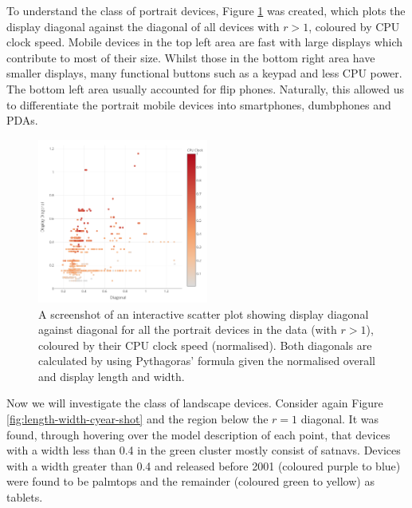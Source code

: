 \documentclass[conference]{IEEEtran}
\begin{document}
To understand the class of portrait devices, Figure \ref{fig:ddiag-diag-ccpu-shot}
was created, which plots the display diagonal against the diagonal of all
devices with $r>1$, coloured by CPU clock speed.
Mobile devices in the top left area are fast with large displays
which contribute to most of their size. Whilst those in the bottom right area
have smaller displays, many functional buttons such as a keypad and less CPU
power. The bottom left area usually accounted for flip phones. Naturally, this
allowed us to differentiate the portrait mobile devices into smartphones,
dumbphones and PDAs.


\begin{figure}
    \centering
    \includegraphics[width=0.5\textwidth]{../Visualisations/A/ddiag-diag-ccpu-shot.png}
	\caption{\label{fig:ddiag-diag-ccpu-shot}A screenshot of an interactive
	scatter plot showing display diagonal against diagonal
	for all the portrait devices in the data (with $r>1$), coloured by their
	CPU clock speed (normalised). Both diagonals are calculated by using
	Pythagoras' formula given the normalised overall and display length and
	width.}
\end{figure}

Now we will investigate the class of landscape devices. Consider again Figure
\ref{fig:length-width-cyear-shot} and the region below the $r=1$ diagonal. It
was found, through hovering over the model description of each point, that
devices with a width less than 0.4 in the green cluster mostly consist of
satnavs. Devices with a width greater than 0.4 and released before 2001
(coloured purple to blue) were found to be palmtops and the remainder
(coloured green to yellow) as tablets.
\end{document}
